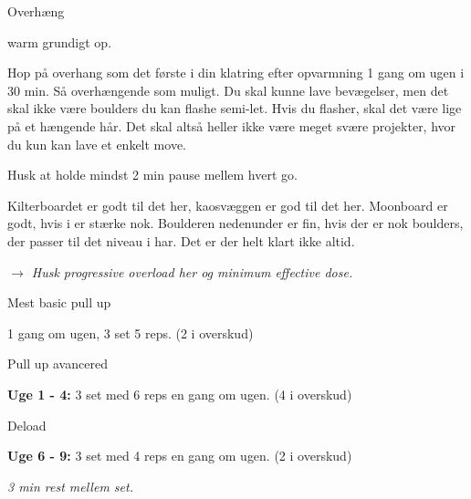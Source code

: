 
\begin{tList}{Overh\ae ng}
\item warm grundigt op.

\item Hop på overhang som det første i din klatring
  efter opvarmning 1 gang om ugen i 30 min. Så overhængende
  som muligt. Du skal kunne lave bevægelser, men det skal ikke være
  boulders du kan flashe semi-let. Hvis du flasher, skal det være
  lige på et hængende hår. Det skal altså heller ikke være meget
  svære projekter, hvor du kun kan lave et enkelt move.

\item Husk at holde mindst 2 min pause mellem hvert go.
\end{tList}

Kilterboardet er godt til det her, kaosvæggen er god til det her.
Moonboard er godt, hvis i er stærke nok. Boulderen nedenunder er
fin, hvis der er nok boulders, der passer til det niveau i har. Det
er der helt klart ikke altid.

\emph{$\rightarrow$ Husk progressive overload her og minimum effective dose.}

\begin{tList}{Mest basic pull up}
\item 1 gang om ugen, 3 set 5 reps. (2 i overskud)
\end{tList}

\begin{tList}{Pull up avancered}
\item \textbf{Uge 1 - 4:} 3 set med 6 reps en gang om ugen. (4 i overskud)
\item {\sc Deload}
\item \textbf{Uge 6 - 9:} 3 set med 4 reps en gang om ugen. (2 i overskud)

        \emph{3 min rest mellem set.}
\end{tList}

